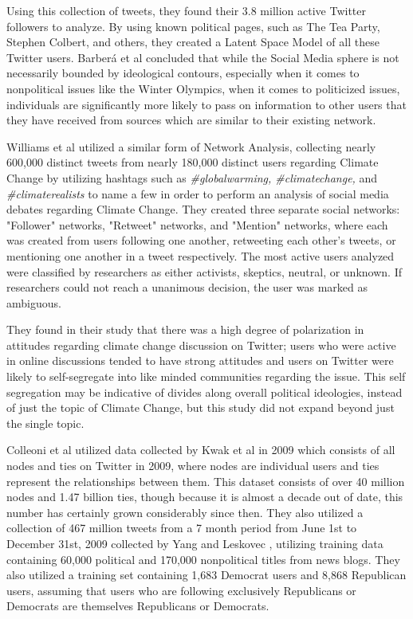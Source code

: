 \documentclass[journal]{IEEEtran}
\begin{document}
	Using this collection of tweets, they found their 3.8 million active Twitter followers to analyze. By using known political pages, such as The Tea Party, Stephen Colbert, and others, they created a Latent Space Model of all these Twitter users.  Barberá et al \cite{barbera} concluded that while the Social Media sphere is not necessarily bounded by ideological contours, especially when it comes to nonpolitical issues like the Winter Olympics, when it comes to politicized issues, individuals are significantly more likely to pass on information to other users that they have received from sources which are similar to their existing network. 
	
	Williams et al \cite{williams} utilized a similar form of Network Analysis, collecting nearly 600,000 distinct tweets from nearly 180,000 distinct users regarding Climate Change by utilizing hashtags such as \textit{\#globalwarming, \#climatechange,} and \textit{\#climaterealists} to name a few in order to perform an analysis of social media debates regarding Climate Change. They created three separate social networks: "Follower" networks, "Retweet" networks, and "Mention" networks, where each was created from users following one another, retweeting each other's tweets, or mentioning one another in a tweet respectively. The most active users analyzed were classified by researchers as either activists, skeptics, neutral, or unknown. If researchers could not reach a unanimous decision, the user was marked as ambiguous. 

	They found in their study that there was a high degree of polarization in attitudes regarding climate change discussion on Twitter; users who were active in online discussions tended to have strong attitudes and users on Twitter were likely to self-segregate into like minded communities regarding the issue. This self segregation may be indicative of divides along overall political ideologies, instead of just the topic of Climate Change, but this study did not expand beyond just the single topic. 
	
	Colleoni et al \cite{colleoni} utilized data collected by Kwak et al \cite{kwak} in 2009 which consists of all nodes and ties on Twitter in 2009, where nodes are individual users and ties represent the relationships between them. This dataset consists of over 40 million nodes and 1.47 billion ties, though because it is almost a decade out of date, this number has certainly grown considerably since then. They also utilized a collection of 467 million tweets from a 7 month period from June 1st to December 31st, 2009 collected by Yang and Leskovec \cite{yang}, utilizing training data containing 60,000 political and 170,000 nonpolitical titles from news blogs. They also utilized a training set containing 1,683 Democrat users and 8,868 Republican users, assuming that users who are following exclusively Republicans or Democrats are themselves Republicans or Democrats. 
\end{document}
